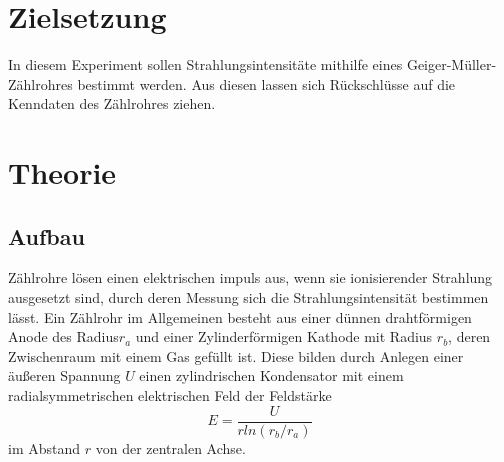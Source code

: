 \documentclass{scrartcl}
\begin{document}
\section{Zielsetzung}
In diesem Experiment sollen Strahlungsintensitäte mithilfe eines Geiger-Müller-Zählrohres bestimmt werden. Aus diesen lassen sich Rückschlüsse auf die Kenndaten des Zählrohres ziehen.
\section{Theorie}
\subsection{Aufbau}
Zählrohre lösen einen elektrischen impuls aus, wenn sie ionisierender Strahlung ausgesetzt sind, durch deren Messung sich die Strahlungsintensität bestimmen lässt.
Ein Zählrohr im Allgemeinen besteht aus einer dünnen drahtförmigen Anode des Radius$r_a$ und einer Zylinderförmigen Kathode mit Radius $r_b$, deren Zwischenraum mit einem Gas gefüllt ist. Diese bilden durch Anlegen einer äußeren Spannung $U$ einen zylindrischen Kondensator mit einem radialsymmetrischen elektrischen Feld der Feldstärke
\begin{equation}
E=\frac{U}{rln(r_b/r_a)}
\end{equation}
im Abstand $r$ von der zentralen Achse.
\end{document}
